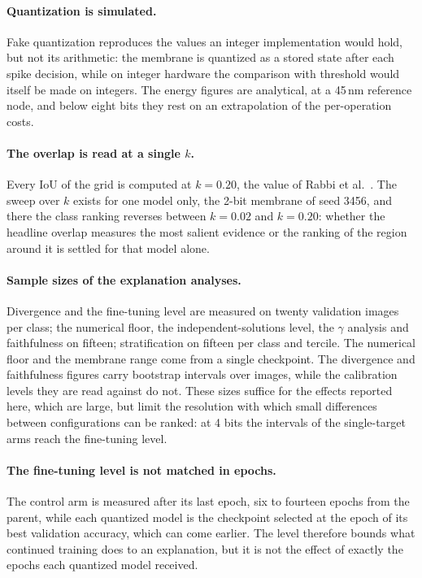 \paragraph{Quantization is simulated.} Fake quantization reproduces the values an
integer implementation would hold, but not its arithmetic: the membrane is
quantized as a stored state after each spike decision, while on integer hardware
the comparison with threshold would itself be made on integers. The energy
figures are analytical, at a 45\,nm reference node, and below eight bits they
rest on an extrapolation of the per-operation costs.

\paragraph{The overlap is read at a single $k$.} Every IoU of the grid is
computed at $k = 0.20$, the value of Rabbi et al.~\cite{rabbi2026}. The sweep
over $k$ exists for one model only, the 2-bit membrane of seed 3456, and there
the class ranking reverses between $k = 0.02$ and $k = 0.20$: whether the
headline overlap measures the most salient evidence or the ranking of the
region around it is settled for that model alone.

\paragraph{Sample sizes of the explanation analyses.} Divergence and the
fine-tuning level are measured on twenty validation images per class; the
numerical floor, the independent-solutions level, the $\gamma$ analysis and
faithfulness on fifteen; stratification on fifteen per class and tercile. The
numerical floor and the membrane range come from a single checkpoint. The
divergence and faithfulness figures carry bootstrap intervals over images, while
the calibration levels they are read against do not. These sizes suffice for the
effects reported here, which are large, but limit the resolution with which
small differences between configurations can be ranked: at 4 bits the intervals
of the single-target arms reach the fine-tuning level.

\paragraph{The fine-tuning level is not matched in epochs.} The control arm is
measured after its last epoch, six to fourteen epochs from the parent, while each
quantized model is the checkpoint selected at the epoch of its best validation
accuracy, which can come earlier. The level therefore bounds what continued
training does to an explanation, but it is not the effect of exactly the epochs
each quantized model received.

